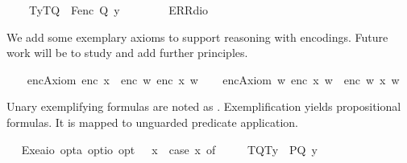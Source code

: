\begin{isabellebody}
\ \ \ \ {\isacharparenleft}T{\isacharparenleft}y{\isacharparenright}{\isacharcomma}T{\isacharparenleft}Q{\isacharparenright}{\isacharparenright}\ {\isasymRightarrow}\ F{\isacharparenleft}{\isacharparenleft}enc\ {\isacharparenleft}Q\ y{\isacharparenright}{\isacharparenright}{\isacharparenright}\ {\isacharbar}\ \isanewline
\ \ \ \ {\isacharunderscore}\ {\isasymRightarrow}\ ERR{\isacharparenleft}dio{\isacharparenright}{\isachardoublequoteclose}%
\begin{isamarkuptext}%
We add some exemplary axioms to support reasoning with encodings. Future work will
 be to study and add further principles.%
\end{isamarkuptext}\isamarkuptrue%
\ \isamarkupfalse%
\ \ encAxiom{}{\isacharcolon}\ {\isachardoublequoteopen}{\isacharparenleft}enc\ x{\isacharparenright}\ {\isasymequiv}\ enc\ {\isacharparenleft}{\isasymlambda}w{\isachardot}\ {\isacharparenleft}enc\ x\ w{\isacharparenright}{\isacharparenright}{\isachardoublequoteclose}\isanewline
\ \isamarkupfalse%
\ \ encAxiom{}{\isacharcolon}\ {\isachardoublequoteopen}{\isacharparenleft}{\isasymlambda}w{\isachardot}\ {\isasymnot}{\isacharparenleft}enc\ x\ w{\isacharparenright}{\isacharparenright}\ {\isasymequiv}\ enc\ {\isacharparenleft}{\isasymlambda}w{\isachardot}\ {\isasymnot}{\isacharparenleft}x\ w{\isacharparenright}{\isacharparenright}{\isachardoublequoteclose}%
\begin{isamarkuptext}%
Unary exemplifying formulas \isa{{\isasymPi}{\isasymkappa}} are noted as \isa{{\isasymlparr}{\isasymPi}{\isacharcomma}{\isasymkappa}{\isasymrparr}}.  
  Exemplification yields propositional formulas. 
  It is mapped to unguarded predicate application.%
\end{isamarkuptext}\isamarkuptrue%
\ \isamarkupfalse%
\ Exe{}{\isacharcolon}{\isacharcolon}{\isachardoublequoteopen}{\isacharparenleft}{\isacharprime}a{\isasymRightarrow}io{\isacharparenright}\ opt{\isasymRightarrow}{\isacharprime}a\ opt{\isasymRightarrow}io\ opt{\isachardoublequoteclose}\ {\isacharparenleft}{\isachardoublequoteopen}{\isasymlparr}{\isacharunderscore}{\isacharcomma}{\isacharunderscore}{\isasymrparr}{\isachardoublequoteclose}{\isacharparenright}\ \ {\isachardoublequoteopen}{\isasymlparr}{\isasymPhi}{\isacharcomma}x{\isasymrparr}\ {\isasymequiv}\ case\ {\isacharparenleft}{\isasymPhi}{\isacharcomma}x{\isacharparenright}\ of\ \isanewline
\ \ \ \ {\isacharparenleft}T{\isacharparenleft}Q{\isacharparenright}{\isacharcomma}T{\isacharparenleft}y{\isacharparenright}{\isacharparenright}\ {\isasymRightarrow}\ P{\isacharparenleft}{\isacharparenleft}Q\ y{\isacharparenright}{\isacharparenright}\ {\isacharbar}\ \isanewline

\end{isabellebody}
